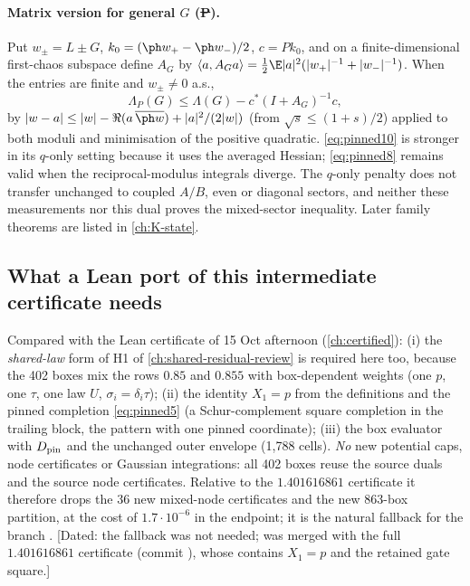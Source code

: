 \paragraph{Matrix version for general $G$ (\st{P}).} Put $w_\pm=L\pm G$, $k_0=(\ph w_+-\ph w_-)/2$, $c=Pk_0$, and on a finite-dimensional first-chaos subspace define $A_G$ by
$\langle a,A_Ga\rangle=\frac12\E|a|^2(|w_+|^{-1}+|w_-|^{-1})$. When the entries are finite and $w_\pm\ne0$ a.s.,
\begin{equation}\label{eq:pinned11}
\Lambda_P(G)\le\Lambda(G)-c^*(I+A_G)^{-1}c ,
\end{equation}
by $|w-a|\le|w|-\Re(a\,\overline{\ph w})+|a|^2/(2|w|)$ (from $\sqrt s\le(1+s)/2$) applied to both moduli and minimisation of the positive quadratic. \eqref{eq:pinned10} is stronger in its
$q$-only setting because it uses the averaged Hessian; \eqref{eq:pinned8} remains valid when the reciprocal-modulus integrals diverge. The $q$-only penalty does not transfer unchanged to coupled $A/B$, even or diagonal sectors, and neither these measurements nor this dual proves the mixed-sector inequality. Later family theorems are listed in \autoref{ch:K-state}.

\subsection{What a Lean port of this intermediate certificate needs}\label{sec:pinned-lean}
Compared with the Lean certificate of 15 Oct afternoon (\autoref{ch:certified}): (i) the \emph{shared-law} form of H1 of \autoref{ch:shared-residual-review} is required here too, because the 402
boxes mix the rows $0.85$ and $0.855$ with box-dependent weights (one $p$, one $\tau$, one law $U$, $\sigma_i=\delta_i\tau$); (ii) the identity $X_1=p$ from the definitions and the pinned
completion \eqref{eq:pinned5} (a Schur-complement square completion in the trailing block, the  pattern with one pinned coordinate); (iii) the box evaluator with
$D_{\rm pin}$ and the unchanged outer envelope (1,788 cells). \emph{No} new potential caps, node certificates or Gaussian integrations: all 402 boxes reuse the source duals and the source
node certificates. Relative to the $1.401616861$ certificate it therefore drops the 36 new mixed-node certificates and the new 863-box partition, at the cost of $1.7\cdot10^{-6}$ in the
endpoint; it is the natural fallback for the branch . [Dated: the fallback was not needed;  was merged with the full $1.401616861$ certificate (commit ), whose  contains $X_1=p$ and the retained gate square.]
